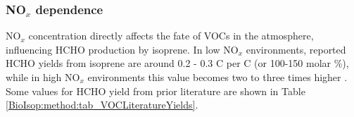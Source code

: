       
    \subsubsection{NO$_x$ dependence}
      
      NO$_x$ concentration directly affects the fate of VOCs in the atmosphere, influencing HCHO production by isoprene.
      In low NO$_x$ environments, reported HCHO yields from isoprene are around 0.2 - 0.3 C per C (or 100-150 molar \%), while in high NO$_x$ environments this value becomes two to three times higher \parencite{Palmer2003, Wolfe2016}.
      Some values for HCHO yield from prior literature are shown in Table \ref{BioIsop:method:tab_VOCLiteratureYields}.
      
      
